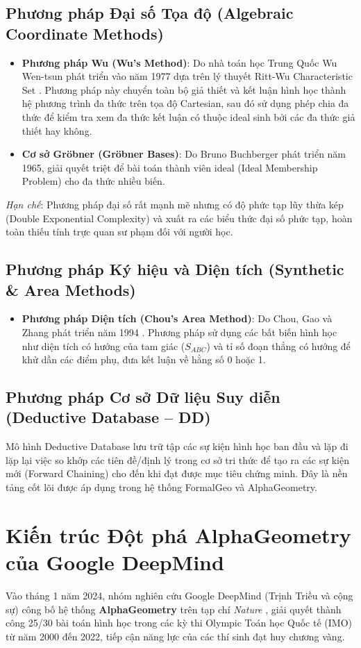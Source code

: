 \subsection{Phương pháp Đại số Tọa độ (Algebraic Coordinate Methods)}
\begin{itemize}
    \item \textbf{Phương pháp Wu (Wu's Method)}: Do nhà toán học Trung Quốc Wu Wen-tsun phát triển vào năm 1977 dựa trên lý thuyết Ritt-Wu Characteristic Set \cite{wu1984basic}. Phương pháp này chuyển toàn bộ giả thiết và kết luận hình học thành hệ phương trình đa thức trên tọa độ Cartesian, sau đó sử dụng phép chia đa thức để kiểm tra xem đa thức kết luận có thuộc ideal sinh bởi các đa thức giả thiết hay không.
    \item \textbf{Cơ sở Gröbner (Gröbner Bases)}: Do Bruno Buchberger phát triển năm 1965, giải quyết triệt để bài toán thành viên ideal (Ideal Membership Problem) cho đa thức nhiều biến.
\end{itemize}
\textit{Hạn chế}: Phương pháp đại số rất mạnh mẽ nhưng có độ phức tạp lũy thừa kép (Double Exponential Complexity) và xuất ra các biểu thức đại số phức tạp, hoàn toàn thiếu tính trực quan sư phạm đối với người học.

\subsection{Phương pháp Ký hiệu và Diện tích (Synthetic \& Area Methods)}
\begin{itemize}
    \item \textbf{Phương pháp Diện tích (Chou's Area Method)}: Do Chou, Gao và Zhang phát triển năm 1994 \cite{chou1994machine}. Phương pháp sử dụng các bất biến hình học như diện tích có hướng của tam giác ($S_{ABC}$) và tỉ số đoạn thẳng có hướng để khử dần các điểm phụ, đưa kết luận về hằng số 0 hoặc 1.
\end{itemize}

\subsection{Phương pháp Cơ sở Dữ liệu Suy diễn (Deductive Database -- DD)}
Mô hình Deductive Database lưu trữ tập các sự kiện hình học ban đầu và lặp đi lặp lại việc so khớp các tiên đề/định lý trong cơ sở tri thức để tạo ra các sự kiện mới (Forward Chaining) cho đến khi đạt được mục tiêu chứng minh. Đây là nền tảng cốt lõi được áp dụng trong hệ thống FormalGeo và AlphaGeometry.

\section{Kiến trúc Đột phá AlphaGeometry của Google DeepMind}
Vào tháng 1 năm 2024, nhóm nghiên cứu Google DeepMind (Trịnh Triều và cộng sự) công bố hệ thống \textbf{AlphaGeometry} trên tạp chí \textit{Nature} \cite{trinh2024alphageometry}, giải quyết thành công 25/30 bài toán hình học trong các kỳ thi Olympic Toán học Quốc tế (IMO) từ năm 2000 đến 2022, tiếp cận năng lực của các thí sinh đạt huy chương vàng.

